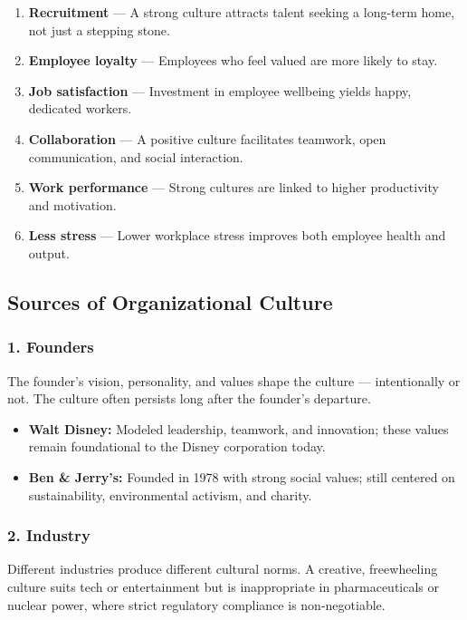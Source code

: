 \documentclass[11pt, letterpaper]{article}
\begin{document}
\begin{enumerate}[leftmargin=*, label=\textbf{\arabic*.}]
  \item \textbf{Recruitment} --- A strong culture attracts talent seeking a long-term home, not just a stepping stone.
  \item \textbf{Employee loyalty} --- Employees who feel valued are more likely to stay.
  \item \textbf{Job satisfaction} --- Investment in employee wellbeing yields happy, dedicated workers.
  \item \textbf{Collaboration} --- A positive culture facilitates teamwork, open communication, and social interaction.
  \item \textbf{Work performance} --- Strong cultures are linked to higher productivity and motivation.
  \item \textbf{Less stress} --- Lower workplace stress improves both employee health and output.
\end{enumerate}

\subsection{Sources of Organizational Culture}

\subsubsection{1. Founders}
The founder's vision, personality, and values shape the culture --- intentionally or not. The culture often persists long after the founder's departure.
\begin{itemize}[leftmargin=*]
  \item \textbf{Walt Disney:} Modeled leadership, teamwork, and innovation; these values remain foundational to the Disney corporation today.
  \item \textbf{Ben \& Jerry's:} Founded in 1978 with strong social values; still centered on sustainability, environmental activism, and charity.
\end{itemize}

\subsubsection{2. Industry}
Different industries produce different cultural norms. A creative, freewheeling culture suits tech or entertainment but is inappropriate in pharmaceuticals or nuclear power, where strict regulatory compliance is non-negotiable.
\end{document}
